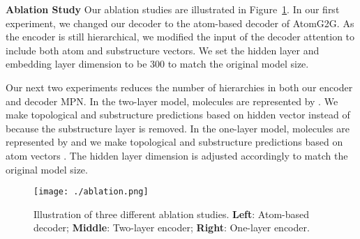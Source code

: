 \documentclass{article} \usepackage{iclr2020_conference,times}
\begin{document}
\textbf{Ablation Study } Our ablation studies are illustrated in Figure~\ref{fig:ablation}. In our first experiment, we changed our decoder to the atom-based decoder of AtomG2G. As the encoder is still hierarchical, we modified the input of the decoder attention to include both atom and substructure vectors. We set the hidden layer and embedding layer dimension to be 300 to match the original model size. 

Our next two experiments reduces the number of hierarchies in both our encoder and decoder MPN. In the two-layer model, molecules are represented by . We make topological and substructure predictions based on hidden vector  instead of  because the substructure layer is removed. 
In the one-layer model, molecules are represented by  and we make topological and substructure predictions based on atom vectors . The hidden layer dimension is adjusted accordingly to match the original model size.

\begin{figure}[t]
    \centering
    \texttt{[image: ./ablation.png]}
    \caption{Illustration of three different ablation studies. \textbf{Left}: Atom-based decoder; \textbf{Middle}: Two-layer encoder; \textbf{Right}: One-layer encoder. }
    \label{fig:ablation}
\end{figure} 
\end{document}

